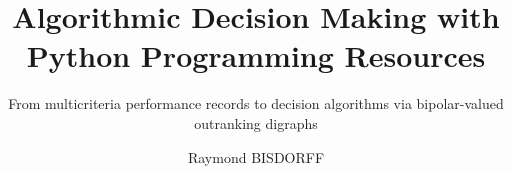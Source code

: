 \documentclass[12pt,envcountchap,sectrefs,english]{svmono}
\begin{document}
\author{Raymond BISDORFF}
\title{Algorithmic Decision Making with Python Programming Resources}
\subtitle{From multicriteria performance records to decision algorithms via bipolar-valued outranking digraphs}
\maketitle

\frontmatter%




\tableofcontents

%

\mainmatter%
\setlength{\tabcolsep}{0.5em}
\lstset{style=pythonstyle}


       



























\end{document}
